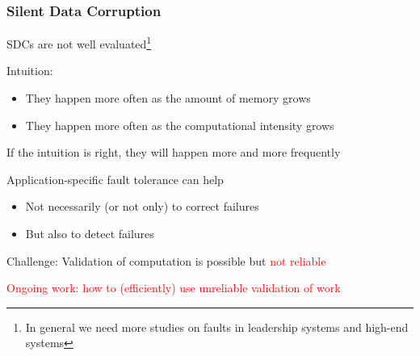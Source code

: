 \begin{frame}
  \frametitle{Silent Data Corruption}

  SDCs are not well evaluated\footnote{In general we need more studies on faults in leadership systems and high-end systems}

  Intuition:
  \begin{itemize}
  \item They happen more often as the amount of memory grows
  \item They happen more often as the computational intensity grows
  \end{itemize}

  If the intuition is right, they will happen more and more frequently

  Application-specific fault tolerance can help
  \begin{itemize}
  \item Not necessarily (or not only) to correct failures
  \item But also to detect failures
  \end{itemize}

  \bigskip

  Challenge: Validation of computation is possible but \textcolor{red}{not reliable}

  \textcolor{red}{Ongoing work: how to (efficiently) use unreliable validation of work}

\end{frame}

